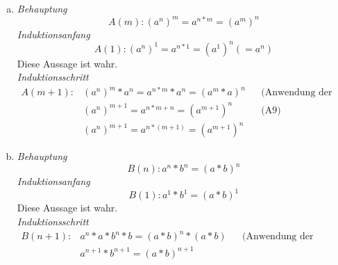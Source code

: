 \documentclass{article}
\begin{document}
\begin{enumerate}[a)]
\item
  \emph{Behauptung}
  \[
    A(m) \colon (a^n)^m = a^{n * m} = (a^m)^n
  \]
  \emph{Induktionsanfang}
  \[
    A(1) \colon (a^n)^1 = a^{n * 1} = (a^1)^n (= a^n) 
  \]
  Diese Aussage ist wahr. \\
  \emph{Induktionsschritt}
  \begin{align*}
    A(m + 1) \colon &(a^n)^m * a^n = a^{n * m} * a^{n} = (a^m * a) ^ n  &&  \text{(Anwendung der Definition der Potenz)}\\
                    &(a^n)^{m + 1} = a^{n * m + n} = (a^{m + 1})^n      && \text{(A9)} \\
                    &(a^n)^{m + 1} = a^{n * (m + 1)} = (a^{m + 1})^n
  \end{align*}

\item
    \emph{Behauptung}
  \[
    B(n) \colon a^n * b^n = (a * b)^n
  \]
  \emph{Induktionsanfang}
  \[
    B(1) \colon a^1 * b^1 = (a * b)^1 
  \]
  Diese Aussage ist wahr. \\
  \emph{Induktionsschritt}
  \begin{align*}
    B(n + 1) \colon &a^n * a * b^n * b = (a * b)^n * (a * b) &&  \text{(Anwendung der Definition der Potenz)}\\
                    &a^{n + 1} * b^{n + 1} = (a * b)^{n + 1}
  \end{align*}
\end{enumerate}
\end{document}
